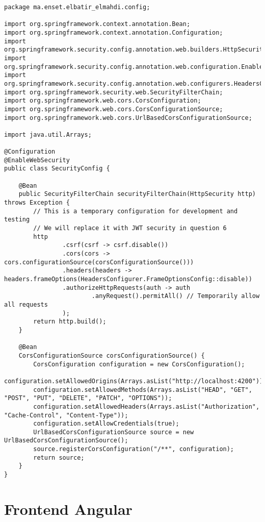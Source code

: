 \begin{lstlisting}[caption=Configuration de Sécurité]
package ma.enset.elbatir_elmahdi.config;

import org.springframework.context.annotation.Bean;
import org.springframework.context.annotation.Configuration;
import org.springframework.security.config.annotation.web.builders.HttpSecurity;
import org.springframework.security.config.annotation.web.configuration.EnableWebSecurity;
import org.springframework.security.config.annotation.web.configurers.HeadersConfigurer;
import org.springframework.security.web.SecurityFilterChain;
import org.springframework.web.cors.CorsConfiguration;
import org.springframework.web.cors.CorsConfigurationSource;
import org.springframework.web.cors.UrlBasedCorsConfigurationSource;

import java.util.Arrays;

@Configuration
@EnableWebSecurity
public class SecurityConfig {

    @Bean
    public SecurityFilterChain securityFilterChain(HttpSecurity http) throws Exception {
        // This is a temporary configuration for development and testing
        // We will replace it with JWT security in question 6
        http
                .csrf(csrf -> csrf.disable())
                .cors(cors -> cors.configurationSource(corsConfigurationSource()))
                .headers(headers -> headers.frameOptions(HeadersConfigurer.FrameOptionsConfig::disable))
                .authorizeHttpRequests(auth -> auth
                        .anyRequest().permitAll() // Temporarily allow all requests
                );
        return http.build();
    }

    @Bean
    CorsConfigurationSource corsConfigurationSource() {
        CorsConfiguration configuration = new CorsConfiguration();
        configuration.setAllowedOrigins(Arrays.asList("http://localhost:4200"));
        configuration.setAllowedMethods(Arrays.asList("HEAD", "GET", "POST", "PUT", "DELETE", "PATCH", "OPTIONS"));
        configuration.setAllowedHeaders(Arrays.asList("Authorization", "Cache-Control", "Content-Type"));
        configuration.setAllowCredentials(true);
        UrlBasedCorsConfigurationSource source = new UrlBasedCorsConfigurationSource();
        source.registerCorsConfiguration("/**", configuration);
        return source;
    }
}
\end{lstlisting}

\section{Frontend Angular}
